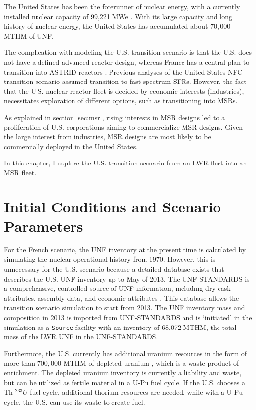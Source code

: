 The United States has been the forerunner of nuclear energy, with a currently 
installed nuclear capacity of 99,221 \gls{MWe} \cite{iaea_nuclear_2017}.
With its large capacity and long history of nuclear
energy, the United States has accumulated about $70,000$ \gls{MTHM} of \gls{UNF}.

The complication with modeling the U.S. transition scenario is that the U.S. does not have
a defined advanced reactor design, whereas France has a central plan to transition into \gls{ASTRID} reactors \cite{boullis_french_2015, varaine_pre-conceptual_2012}.
Previous analyses of the United States \cite{worrall_utilization_2013, sunny_transition_2015}
 \gls{NFC} transition scenario
assumed transition to fast-spectrum \glspl{SFR}.
However, the fact that the U.S. nuclear reactor fleet
is decided by economic interests (industries), necessitates
exploration of different options, such as transitioning into \glspl{MSR}.

As explained in section \ref{sec:msr}, rising interests in \gls{MSR} designs
led to a proliferation of U.S. corporations aiming to commercialize
\gls{MSR} designs. Given the large interest from industries,
\gls{MSR} designs are
most likely to be commercially deployed in the United States.

In this chapter, I explore the U.S. transition scenario
from an \gls{LWR} fleet into an \gls{MSR} fleet.

\section{Initial Conditions and Scenario Parameters}

For the French scenario, the \gls{UNF} inventory at the present
time is calculated by simulating the nuclear operational history from 1970.
However, this is unnecessary for the U.S. scenario because a detailed
database exists that describes the U.S. \gls{UNF} inventory up to May of 2013.
The \gls{UNF-STANDARDS} is a comprehensive,
controlled source of \gls{UNF} information, including dry cask attributes, assembly
data, and economic attributes \cite{peterson_unf-st&dards_2017}. This database
allows the transition scenario simulation to start from 2013. The \gls{UNF} inventory mass and composition in 2013
is imported from \gls{UNF-STANDARDS} and is `initiated' in the simulation
as a \texttt{Source} facility with an inventory of 68,072 MTHM,
the total mass of the \gls{LWR} \gls{UNF} in the \gls{UNF-STANDARDS}.

Furthermore, the U.S. currently has additional uranium resources in the
form of more than $700,000$ MTHM of depleted uranium \cite{office_nuclear_2011},
which is a waste product of enrichment. The depleted uranium inventory
is currently a liability and waste, but can be utilized as fertile material
in a U-Pu fuel cycle. If the U.S. chooses a Th-$^233U$ fuel cycle,
additional thorium resources are needed, while with a U-Pu cycle, the
U.S. can use its waste to create fuel.

